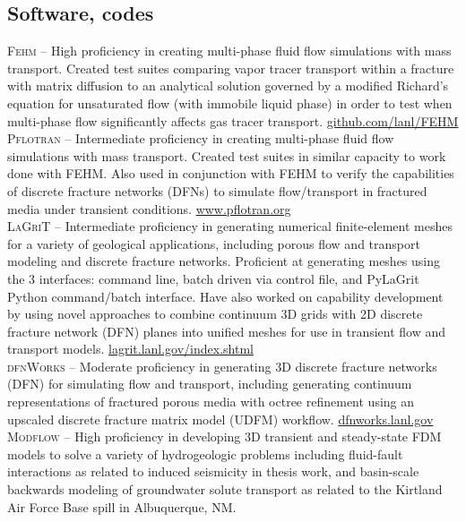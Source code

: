 \documentclass[11pt, letterpaper]{article}
\begin{document}
\subsection*{Software, codes}
\noindent
\textsc{Fehm} – High proficiency in creating multi-phase fluid flow simulations with mass transport. Created test suites comparing vapor tracer transport within a fracture with matrix diffusion to an analytical solution governed by a modified Richard’s equation for unsaturated flow (with immobile liquid phase) in order to test when multi-phase flow significantly affects gas tracer transport. \href{https://github.com/lanl/FEHM}{github.com/lanl/FEHM} \\[5pt]
\textsc{Pflotran} – Intermediate proficiency in creating multi-phase fluid flow simulations with mass transport. Created test suites in similar capacity to work done with FEHM. Also used in conjunction with FEHM to verify the capabilities of discrete fracture networks (DFNs) to simulate flow/transport in fractured media under transient conditions. \href{https://www.pflotran.org}{www.pflotran.org} \\[5pt]
\textsc{LaGriT} – Intermediate proficiency in generating numerical finite-element meshes for a variety of geological applications, including porous flow and transport modeling and discrete fracture networks. Proficient at generating meshes using the 3 interfaces: command line, batch driven via control file, and PyLaGrit Python command/batch interface. Have also worked on capability development by using novel approaches to combine continuum 3D grids with 2D discrete fracture network (DFN) planes into unified meshes for use in transient flow and transport models. \href{https://lagrit.lanl.gov/index.shtml}{lagrit.lanl.gov/index.shtml} \\[5pt]
\textsc{dfnWorks} – Moderate proficiency in generating 3D discrete fracture
networks (DFN) for simulating flow and transport, including generating
continuum representations of fractured porous media with octree refinement
using an upscaled discrete fracture matrix model (UDFM) workflow.
\href{https://dfnworks.lanl.gov}{dfnworks.lanl.gov} \\[5pt] 
\textsc{Modflow} – High proficiency in developing 3D transient and steady-state FDM models to solve a variety of hydrogeologic problems including fluid-fault interactions as related to induced seismicity in thesis work, and basin-scale backwards modeling of groundwater solute transport as related to the Kirtland Air Force Base spill in Albuquerque, NM.\\[5pt]
\end{document}
